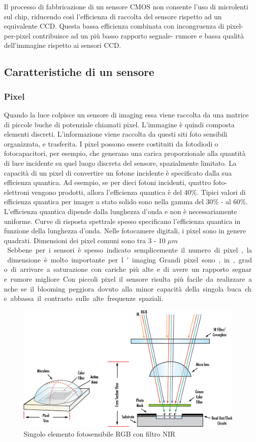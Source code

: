 Il processo di fabbricazione di un sensore CMOS non consente l'uso di
microlenti sul chip, riducendo così l'efficienza di raccolta  del sensore
rispetto ad un equivalente CCD. Questa bassa efficienza combinata con
incongruenza di pixel-per-pixel contribuisce ad un più basso rapporto segnale-
rumore e bassa qualità dell'immagine rispetto ai sensori CCD.

\subsection{Caratteristiche di un sensore}

\subsubsection{Pixel}
Quando la luce colpisce un sensore di imaging essa viene raccolta da una matrice di piccole buche di potenziale chiamati pixel.
 L'immagine è quindi composta elementi discreti. L'informazione viene raccolta da questi siti foto sensibili organizzata, e trasferita.
I pixel possono essere costituiti da fotodiodi o fotocapacitori, per esempio, che generano una carica proporzionale alla quantità di luce incidente su quel luogo discreta del sensore, spazialmente limitato. La capacità di un pixel di convertire un fotone incidente è specificato dalla sua efficienza quantica. Ad esempio, se per dieci fotoni incidenti, quattro foto-elettroni vengono prodotti, allora l'efficienza quantica è del 40\%. Tipici valori di efficienza quantica per imager a stato solido sono nella gamma del 30\% - al 60\%. L'efficienza quantica dipende dalla lunghezza d'onda e non è necessariamente uniforme. Curve di risposta spettrale spesso specificano l'efficienza quantica in funzione della lunghezza d'onda.
Nelle fotocamere digitali, i pixel sono in genere quadrati. Dimensioni dei pixel comuni sono tra 3 - 10 \unit{$\mu m$}. Sebbene per i sensori è spesso indicato semplicemente il numero di pixel, la dimensione è molto importante per l'imaging. Grandi pixel sono, in, grado di arrivare a saturazione con cariche più alte e di avere un rapporto segnare rumore migliore. Con piccoli pixel il sensore risulta più facile da realizzare anche se il blooming peggiora dovuto alla minor capacità della singola buca che abbassa il contrasto sulle alte frequenze spaziali.
\begin{figure}[!ht]
\centering
\includegraphics[width=.8\textwidth]{img/pixel.png}
\caption{Singolo elemento fotosensibile RGB con filtro NIR}
\label{fig:pixel}
\end{figure}


